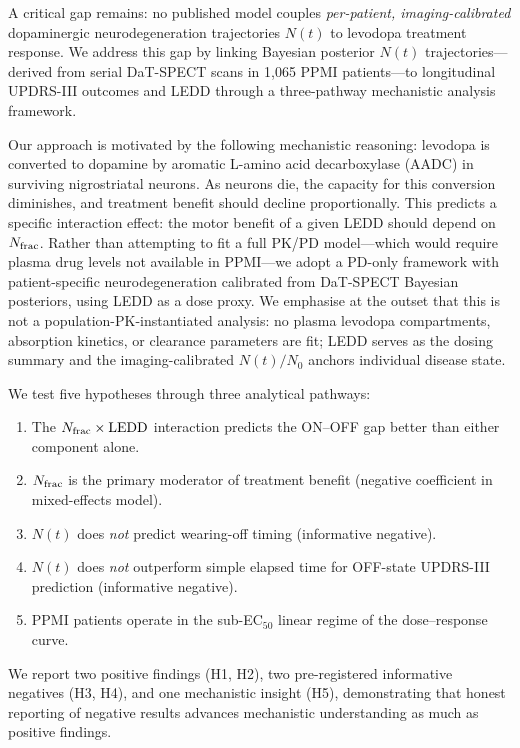 A critical gap remains: no published model couples \textit{per-patient,
imaging-calibrated} dopaminergic neurodegeneration trajectories $N(t)$ to
levodopa treatment response. We address this gap by linking Bayesian
posterior $N(t)$ trajectories---derived from serial DaT-SPECT scans in
1,065 PPMI patients---to longitudinal UPDRS-III outcomes and LEDD through
a three-pathway mechanistic analysis framework.

Our approach is motivated by the following mechanistic reasoning:
levodopa is converted to dopamine by aromatic L-amino acid decarboxylase
(AADC) in surviving nigrostriatal neurons. As neurons die, the capacity
for this conversion diminishes, and treatment benefit should decline
proportionally. This predicts a specific interaction effect: the motor
benefit of a given LEDD should depend on $N_{\mathrm{frac}}$. Rather than attempting
to fit a full PK/PD model---which would require plasma drug levels not
available in PPMI---we adopt a PD-only framework with patient-specific
neurodegeneration calibrated from DaT-SPECT Bayesian posteriors, using
LEDD as a dose proxy. We emphasise at the outset that this is not a
population-PK-instantiated analysis: no plasma levodopa compartments,
absorption kinetics, or clearance parameters are fit; LEDD serves as
the dosing summary and the imaging-calibrated $N(t)/N_0$ anchors
individual disease state.

We test five hypotheses through three analytical pathways:
\begin{enumerate}[label=\textbf{H\arabic*:}, leftmargin=2.5em]
  \item The $N_{\mathrm{frac}} \times \mathrm{LEDD}$ interaction predicts the ON--OFF gap
    better than either component alone.
  \item $N_{\mathrm{frac}}$ is the primary moderator of treatment benefit
    (negative coefficient in mixed-effects model).
  \item $N(t)$ does \textit{not} predict wearing-off timing
    (informative negative).
  \item $N(t)$ does \textit{not} outperform simple elapsed time for
    OFF-state UPDRS-III prediction (informative negative).
  \item PPMI patients operate in the sub-EC$_{50}$ linear regime of the
    dose--response curve.
\end{enumerate}

We report two positive findings (H1, H2), two pre-registered informative
negatives (H3, H4), and one mechanistic insight (H5), demonstrating that
honest reporting of negative results advances mechanistic understanding
as much as positive findings.


